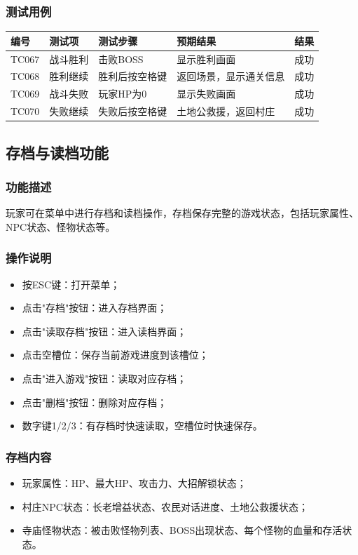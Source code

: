 \documentclass[a4paper,12pt]{article}
\begin{document}
\subsubsection{测试用例}
\begin{longtable}{p{1.2cm} p{2.8cm} p{4cm} p{3.5cm} p{1.5cm}}
\toprule
\textbf{编号} & \textbf{测试项} & \textbf{测试步骤} & \textbf{预期结果} & \textbf{结果} \\
\midrule
\endhead
TC067 & 战斗胜利 & 击败BOSS & 显示胜利画面 & 成功 \\
TC068 & 胜利继续 & 胜利后按空格键 & 返回场景，显示通关信息 & 成功 \\
TC069 & 战斗失败 & 玩家HP为0 & 显示失败画面 & 成功 \\
TC070 & 失败继续 & 失败后按空格键 & 土地公救援，返回村庄 & 成功 \\
\bottomrule
\end{longtable}

\subsection{存档与读档功能}

\subsubsection{功能描述}
玩家可在菜单中进行存档和读档操作，存档保存完整的游戏状态，包括玩家属性、NPC状态、怪物状态等。

\subsubsection{操作说明}
\begin{itemize}[leftmargin=2em]
    \item 按ESC键：打开菜单；
    \item 点击"存档"按钮：进入存档界面；
    \item 点击"读取存档"按钮：进入读档界面；
    \item 点击空槽位：保存当前游戏进度到该槽位；
    \item 点击"进入游戏"按钮：读取对应存档；
    \item 点击"删档"按钮：删除对应存档；
    \item 数字键1/2/3：有存档时快速读取，空槽位时快速保存。
\end{itemize}

\subsubsection{存档内容}
\begin{itemize}[leftmargin=2em]
    \item 玩家属性：HP、最大HP、攻击力、大招解锁状态；
    \item 村庄NPC状态：长老增益状态、农民对话进度、土地公救援状态；
    \item 寺庙怪物状态：被击败怪物列表、BOSS出现状态、每个怪物的血量和存活状态。
\end{itemize}
\end{document}
